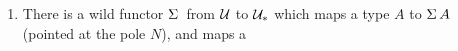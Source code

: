 \documentclass[english,a4]{article}
\renewcommand{\ap}[1]{\left[{#1}\right]}
\newcommand{\UUptd}{\UU_{\ast}}
\begin{document}
\begin{example}
\begin{enumerate}
    \item There is a wild functor $\susp \null$ from $\mathcal{U}$ to $\UUptd$ which
      maps a type $A$ to $\operatorname{\Sigma} A$ (pointed at the pole $N$), and maps a

\end{enumerate}
\end{example}
\end{document}
